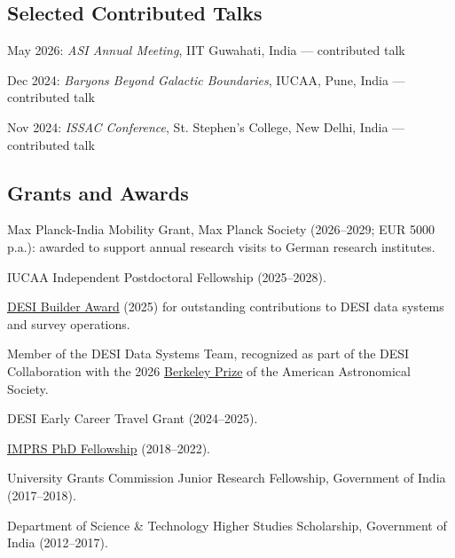 \documentclass[11pt,letterpaper]{article}
\begin{document}
\vspace{-1.5mm}
\subsection{Selected Contributed Talks}
\begin{list}{}{\cvlist}
\item May 2026: \emph{ASI Annual Meeting}, IIT Guwahati, India --- contributed talk
\item Dec 2024: \emph{Baryons Beyond Galactic Boundaries}, IUCAA, Pune, India --- contributed talk
\item Nov 2024: \emph{ISSAC Conference}, St. Stephen's College, New Delhi, India --- contributed talk
\end{list}
\vspace{-1.5mm}

\subsection{Grants and Awards}
\begin{list}{}{\cvlist}
\item Max Planck-India Mobility Grant, Max Planck Society (2026--2029; EUR 5000 p.a.): awarded to support annual research visits to German research institutes.
\item IUCAA Independent Postdoctoral Fellowship (2025--2028).
\item \href{https://www.desi.lbl.gov/collaboration/desi-builders/}{DESI Builder Award} (2025) for outstanding contributions to DESI data systems and survey operations.
\item Member of the DESI Data Systems Team, recognized as part of the DESI Collaboration with the 2026 \href{https://aas.org/press/desi-collaboration-receive-2026-berkeley-prize}{Berkeley Prize} of the American Astronomical Society.
\item DESI Early Career Travel Grant (2024--2025).
\item \href{https://www.imprs-astro.mpg.de/content/student-class-2018-2021.html}{IMPRS PhD Fellowship} (2018--2022).
\item University Grants Commission Junior Research Fellowship, Government of India (2017--2018).
\item Department of Science \& Technology Higher Studies Scholarship, Government of India (2012--2017).
\end{list}

\vspace{-1.5mm}
\end{document}
